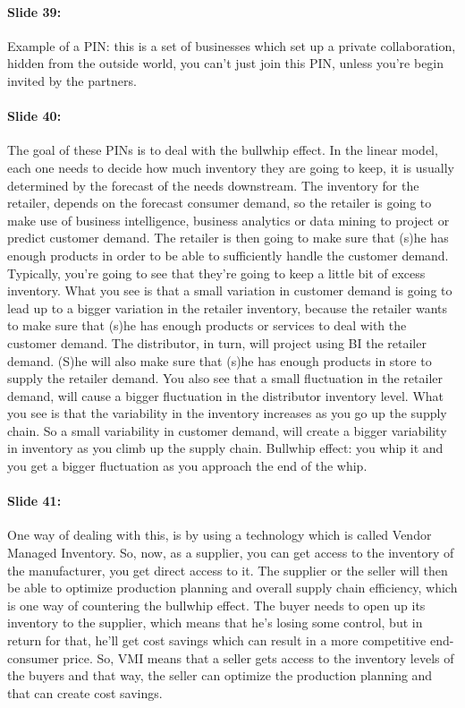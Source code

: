 \documentclass[10pt,a4paper]{report}
\begin{document}
\paragraph{Slide 39:}Example of a PIN: this is a set of businesses which set up a private collaboration, hidden from the outside world, you can't just join this PIN, unless you're begin invited by the partners.

\paragraph{Slide 40:}The goal of these PINs is to deal with the bullwhip effect. In the linear model, each one needs to decide how much inventory they are going to keep, it is usually determined by the forecast of the needs downstream. The inventory for the retailer, depends on the forecast consumer demand, so the retailer is going to make use of business intelligence, business analytics or data mining to project or predict customer demand. The retailer is then going to make sure that (s)he has enough products in order to be able to sufficiently handle the customer demand. Typically, you're going to see that they're going to keep a little bit of excess inventory. What you see is that a small variation in customer demand is going to lead up to a bigger variation in the retailer inventory, because the retailer wants to make sure that (s)he has enough products or services to deal with the customer demand. The distributor, in turn, will project using BI the retailer demand. (S)he will also make sure that (s)he has enough products in store to supply the retailer demand. You also see that a small fluctuation in the retailer demand, will cause a bigger fluctuation in the distributor inventory level.
What you see is that the variability in the inventory increases as you go up the supply chain. So a small variability in customer demand, will create a bigger variability in inventory as  you climb up the supply chain.
Bullwhip effect: you whip it and you get a bigger fluctuation as you approach the end of the whip.

\paragraph{Slide 41:}One way of dealing with this, is by using a technology which is called Vendor Managed Inventory. So, now, as a supplier, you can get access to the inventory of the manufacturer, you get direct access to it. The supplier or the seller will then be able to optimize production planning and overall supply chain efficiency, which is one way of countering the bullwhip effect. The buyer needs to open up its inventory to the supplier, which means that he's losing some control, but in return for that, he'll get cost savings which can result in a more competitive end-consumer price.
So, VMI means that a seller gets access to the inventory levels of the buyers and that way, the seller can optimize the production planning and that can create cost savings. 
\end{document}
